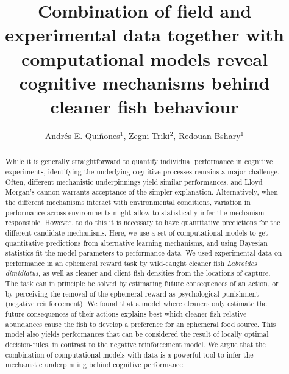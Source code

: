 \documentclass[]{rsos}%
\begin{document}
\title{Combination of field and experimental data together with computational models reveal cognitive mechanisms behind cleaner fish behaviour}

\author{
Andrés E. Quiñones$^{1}$,
Zegni Triki$^{2}$,
Redouan Bshary$^{1}$}

\address{
  $^{1}$Institute of Biology, University of Neuchâtel, Neuchâtel, Switzerland\\
  $^{2}$Department of Zoology, Stockholm University, Stockholm, Sweden}
\subject{
Behavioural ecology,
Cognitive ecology,
Animal behaviour}



\begin{abstract}
While it is generally straightforward to quantify individual performance in cognitive experiments, identifying the underlying cognitive processes remains a major challenge. Often, different mechanistic underpinnings yield similar performances, and Lloyd Morgan's cannon warrants acceptance of the simpler explanation. Alternatively, when the different mechanisms interact with environmental conditions, variation in performance across environments might allow to statistically infer the mechanism responsible. However, to do this it is necessary to have quantitative predictions for the different candidate mechanisms. Here, we use a set of computational models to get quantitative predictions from alternative learning mechanisms, and using Bayesian statistics fit the model parameters to performance data. We used experimental data on performance in an ephemeral reward task by wild-caught cleaner fish \emph{Labroides dimidiatus}, as well as cleaner and client fish densities from the locations of capture. The task can in principle be solved by estimating future consequences of an action, or by perceiving the removal of the ephemeral reward as psychological punishment (negative reinforcement). We found that a model where cleaners only estimate the future consequences of their actions explains best which cleaner fish relative abundances cause the fish to develop a preference for an ephemeral food source. This model also yields performances that can be considered the result of locally optimal decision-rules, in contrast to the negative reinforcement model. We argue that the combination of computational models with data is a powerful tool to infer the mechanistic underpinning behind cognitive performance.
\end{abstract}
\end{document}
